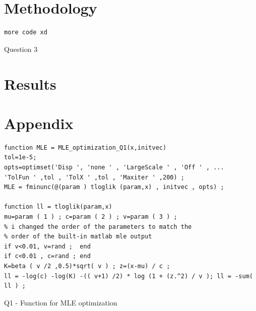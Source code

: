 \documentclass[12pt]{article}
\begin{document}
\newpage
\section{Methodology}

\begin{Program}[!htb]
\begin{lstlisting}[style=Matlab-editor,basicstyle=\mlttfamily\footnotesize]
more code xd
\end{lstlisting}
\caption{Question 3 }
\label{Question 3 }
\end{Program}

\section{Results}

\newpage
\section{Appendix}

\begin{Program}[!htb]
\begin{lstlisting}[style=Matlab-editor,basicstyle=\mlttfamily\footnotesize]
%Q1 - Function for MLE optimization ---------------------------------------
function MLE = MLE_optimization_Q1(x,initvec)
tol=1e-5;
opts=optimset('Disp ', 'none ' , 'LargeScale ' , 'Off ' , ...
'TolFun ' ,tol , 'TolX ' ,tol , 'Maxiter ' ,200) ;
MLE = fminunc(@(param ) tloglik (param,x) , initvec , opts) ;

function ll = tloglik(param,x)
mu=param ( 1 ) ; c=param ( 2 ) ; v=param ( 3 ) ; 
% i changed the order of the parameters to match the 
% order of the built-in matlab mle output
if v<0.01, v=rand ;  end 
if c<0.01 , c=rand ; end 
K=beta ( v /2 ,0.5)*sqrt( v ) ; z=(x-mu) / c ;
ll = -log(c) -log(K) -(( v+1) /2) * log (1 + (z.^2) / v ); ll = -sum( ll ) ;
\end{lstlisting}
\caption{Q1 - Function for MLE optimization}
\label{Q1 - Function for MLE optimization}
\end{Program}
\end{document}
